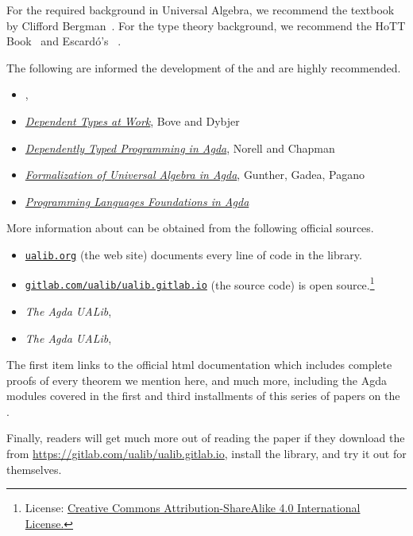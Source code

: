 For the required background in Universal Algebra, we recommend the textbook by Clifford Bergman~\cite{Bergman:2012}.  For the type theory background, we recommend the HoTT Book~\cite{HoTT} and Escard\'o's \ufcourse~\cite{MHE}.

The following are informed the development of the \ualib and are highly recommended.
\begin{itemize}
\item \textit{\ufcourse}, \escardo~\cite{MHE}
\item \href{http://www.cse.chalmers.se/~peterd/papers/DependentTypesAtWork.pdf}{\it Dependent Types at Work}, Bove and Dybjer~\cite{Bove:2009}
\item \href{http://www.cse.chalmers.se/~ulfn/papers/afp08/tutorial.pdf}{\it Dependently Typed Programming in Agda}, Norell and Chapman~\cite{Norell:2008}
\item \href{http://www.sciencedirect.com/science/article/pii/S1571066118300768}{\it Formalization of Universal Algebra in Agda}, Gunther, Gadea, Pagano~\cite{Gunther:2018}
\item \href{https://plfa.github.io/}{\it Programming Languages Foundations in Agda}~\cite{Wadler:2020}
\end{itemize}

More information about \agdaualib can be obtained from the following official sources.
\begin{itemize}
  \item \href{https://ualib.gitlab.io}{\texttt{ualib.org}} (the web site) documents every line of code in the library.
  \item \href{https://gitlab.com/ualib/ualib.gitlab.io}{\texttt{gitlab.com/ualib/ualib.gitlab.io}} (the source code) \agdaualib is open source.\footnote{License: \href{https://creativecommons.org/licenses/by-sa/4.0/}{Creative Commons Attribution-ShareAlike 4.0 International License.}}
  \item \emph{The Agda UALib}, \otherparta
  \item \emph{The Agda UALib}, \otherpartb
\end{itemize}
The first item links to the official \ualib html documentation which includes complete proofs of every theorem we mention here, and much more, including the Agda modules covered in the first and third installments of this series of papers on the \ualib.

Finally, readers will get much more out of reading the paper if they download the \agdaualib from \url{https://gitlab.com/ualib/ualib.gitlab.io}, install the library, and try it out for themselves.